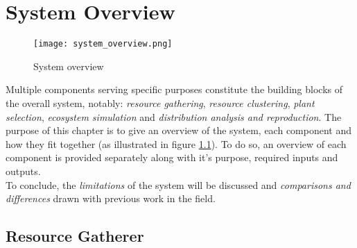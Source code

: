 \chapter{System Overview}

\begin{figure}
\center
	\texttt{[image: system\_overview.png]}
	\caption{ System overview}	
	\label{fig:system_overview}
\end{figure}

Multiple components serving specific purposes constitute the building blocks of the overall system, notably: \textit{resource gathering}, \textit{resource clustering}, \textit{plant selection}, \textit{ecosystem simulation} and \textit{distribution analysis and reproduction}. The purpose of this chapter is to give an overview of the system, each component and how they fit together (as illustrated in figure \ref{fig:system_overview}). To do so, an overview of each component is provided separately along with it's purpose, required inputs and outputs.\\
To conclude, the \textit{limitations} of the system will be discussed and \textit{comparisons and differences} drawn with previous work in the field.

\section{Resource Gatherer} \label{sec:resource_gatherer}

